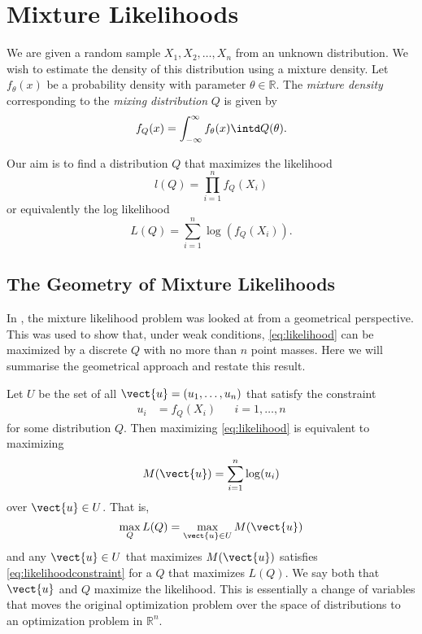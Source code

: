 \chapter{Mixture Likelihoods}
\label{Ch: Mixture Likelihoods}


We are given a random sample $X_1,X_2,\dots,X_n$ from an unknown distribution. We wish to estimate the density of this distribution using a mixture density. Let $f_\theta(x)$ be a probability density with parameter $\theta \in \mathbb{R}$. The \emph{mixture density} corresponding to the \emph{mixing distribution} $Q$ is given by
\begin{equation}
	f_Q(x) = \int_{-\infty}^{\infty} f_\theta(x) \intd Q(\theta).
	\label{eq:mixturedefinition}
\end{equation}

Our aim is to find a distribution $Q$ that maximizes the likelihood
\begin{equation}
	l(Q) = \prod_{i = 1}^n f_Q(X_i)
	\label{eq:nonloglikelihood}
\end{equation}
or equivalently the log likelihood
\begin{equation}
	L(Q) = \sum_{i = 1}^n \log(f_Q(X_i)).
	\label{eq:likelihood}
\end{equation}

\section{The Geometry of Mixture Likelihoods}
\label{sec:mixturelikelihoods:geometrical}
	In \cite{Lindsay1983-tf}, the mixture likelihood problem was looked at from a geometrical perspective. This was used to show that, under weak conditions, \eqref{eq:likelihood} can be maximized by a discrete $Q$ with no more than $n$ point masses. Here we will summarise the geometrical approach and restate this result.

	Let $U$ be the set of all $\vect{u} = (u_1,\dots,u_n)$ that satisfy the constraint
	\begin{align}
	u_i &= f_Q(X_i)	&& i = 1,\dots,n
	\label{eq:likelihoodconstraint}
	\end{align}
	for some distribution $Q$. Then maximizing \eqref{eq:likelihood} is equivalent to maximizing
	\begin{equation}
	M(\vect{u}) = \sum_{i=1}^n \log(u_i)
	\label{eq:transformedlikelihood}
	\end{equation}
	over $\vect{u} \in U$. That is,
	\begin{equation}
	\max_Q L(Q)  = \max_{\vect{u} \in U} M(\vect{u})
	\end{equation}
	and any $\vect{u} \in U$ that maximizes $M(\vect{u})$ satisfies \eqref{eq:likelihoodconstraint} for a $Q$ that maximizes $L(Q)$. We say both that $\vect{u}$ and $Q$ maximize the likelihood. This is essentially a change of variables that moves the original optimization problem over the space of distributions to an optimization problem in $\mathbb{R}^n$. 

